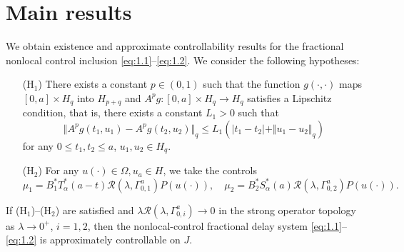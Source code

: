 \documentclass[a4paper,11pt,twoside]{article}
\begin{document}

\section{Main results}

We obtain existence and approximate controllability results
for the fractional nonlocal control inclusion
\eqref{eq:1.1}--\eqref{eq:1.2}. We consider the following hypotheses:
\begin{itemize}
\item[(H$_1$)] There exists a constant $p\in(0, 1)$
such that the function $g(\cdot,\cdot)$ maps
$[0, a]\times H_{q}$ into $H_{p+q}$ and $A^{p}g: [0, a]\times H_{q}\rightarrow H_{q}$
satisfies a Lipschitz condition, that is, there exists a constant $L_{1}>0$ such that
\begin{equation}
\label{eq:3.1}
\Vert A^{p}g(t_{1}, u_{1})-A^{p}g(t_{2}, u_{2})\Vert_{q}
\leq L_{1}\left(\vert t_{1}-t_{2}\vert + \Vert u_{1}-u_{2}\Vert_{q}\right)
\end{equation}
for any $0\leq t_{1},t_{2}\leq a$, $u_{1}, u_{2}\in H_{q}$.

\item[(H$_2$)] For any $u(\cdot)\in \Omega, u_{a}\in H$, we take the controls
\begin{equation}
\label{eq:3.3}
\mu_{1}=B_{1}^{\ast}T_{\alpha}^{\ast}(a-t)
\mathcal{R}(\lambda, \Gamma^{a}_{0,1})P(u(\cdot)),
\quad \mu_{2}=B_{2}^{\ast}S_{\alpha}^{\ast}(a)
\mathcal{R}(\lambda, \Gamma^{a}_{0,2})P(u(\cdot)).
\end{equation}
\end{itemize}
\begin{theorem}
\label{Theorem:3.2}
If (H$_1$)--(H$_2$) are satisfied and
$\lambda\mathcal{R}(\lambda, \Gamma^{a}_{0,i})\rightarrow 0$
in the strong operator topology as $\lambda\rightarrow 0^{+}$, $i=1,2$,
then the nonlocal-control fractional delay system \eqref{eq:1.1}--\eqref{eq:1.2}
is approximately controllable on $J$.
\end{theorem}
\end{document}
